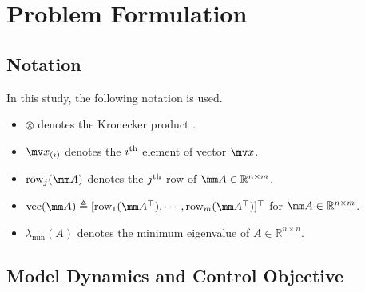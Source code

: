 \documentclass[letterpaper, 10 pt, conference]{ieeeconf}  %
\begin{document}
\section{Problem Formulation}\label{sec: Problem Formulation}

\subsection{Notation}
In this study, the following notation is used.

\begin{itemize}
    \item $\otimes$ denotes the Kronecker product \cite{Bernstein:2009aa}.
    \item $\mv x_{(i)}$ denotes the $i\textsuperscript{th}$ element of vector $\mv x$.    
    \item $\text{row}_j(\mm A)$ denotes the $j\textsuperscript{th}$ row of $\mm A\in\mathbb{R}^{n\times m}$. 
    \item $\text{vec}(\mm A)\triangleq [\text{row}_1(\mm A^\top )  ,\cdots,\text{row}_m(\mm A^\top )]^\top $ for $\mm A\in\mathbb{R}^{n\times m}$.
    \item $\lambda_\text{min}(A)$ denotes the minimum eigenvalue of $A\in\mathbb{R}^{n\times n}$.
\end{itemize}

\subsection{Model Dynamics and Control Objective}
\end{document}
